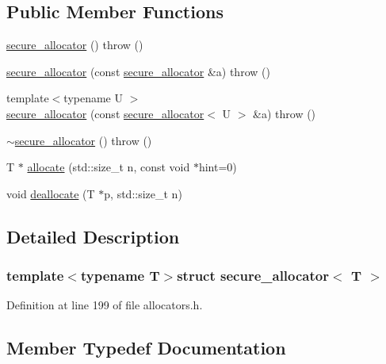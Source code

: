 \subsection*{Public Member Functions}
\begin{DoxyCompactItemize}
\item 
\hyperlink{structsecure__allocator_ac5a927e4133d37b72aece43242903760}{secure\+\_\+allocator} ()  throw ()
\item 
\hyperlink{structsecure__allocator_ae5bfb3589a310e55894bae988d566c44}{secure\+\_\+allocator} (const \hyperlink{structsecure__allocator}{secure\+\_\+allocator} \&a)  throw ()
\item 
{\footnotesize template$<$typename U $>$ }\\\hyperlink{structsecure__allocator_ad7605317012ed2eed2eecb955345d140}{secure\+\_\+allocator} (const \hyperlink{structsecure__allocator}{secure\+\_\+allocator}$<$ U $>$ \&a)  throw ()
\item 
\hyperlink{structsecure__allocator_ac942adb3e90eff2b3b17be72a63c86a8}{$\sim$secure\+\_\+allocator} ()  throw ()
\item 
T $\ast$ \hyperlink{structsecure__allocator_aee6c375ead3ab5b477898787308bd2d9}{allocate} (std\+::size\+\_\+t n, const void $\ast$hint=0)
\item 
void \hyperlink{structsecure__allocator_af86cc49185bd507b8b479e070d744eb0}{deallocate} (T $\ast$p, std\+::size\+\_\+t n)
\end{DoxyCompactItemize}


\subsection{Detailed Description}
\subsubsection*{template$<$typename T$>$struct secure\+\_\+allocator$<$ T $>$}



Definition at line 199 of file allocators.\+h.



\subsection{Member Typedef Documentation}
\hypertarget{structsecure__allocator_aecbe486abe3e32e35e3289e149bd2356}{}
